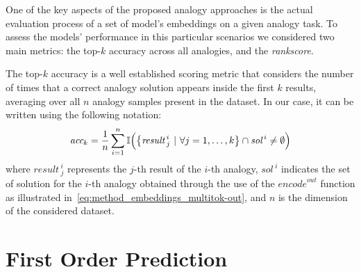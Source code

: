 One of the key aspects of the proposed analogy approaches is the actual evaluation process of a set of model's embeddings on a given analogy task.
To assess the models' performance in this particular scenarios we considered two main metrics: the top-$k$ accuracy across all analogies, and the \emph{rankscore}.

The top-$k$ accuracy is a well established scoring metric that considers the number of times that a correct analogy solution appears inside the first $k$ results, averaging over all $n$ analogy samples present in the dataset.
In our case, it can be written using the following notation:
\begin{equation}
    \label{eq:method_embeddings_topk-accuracy}
    \textit{acc}_k = \frac{1}{n} \sum_{i=1}^{n} \mathbb{I}\Bigl( {\left\{ {\textit{result}\,}^i_j \ |\ \forall j = 1,\ldots,k \right\}} \cap {\textit{sol}\,}^i \neq \emptyset \Bigr)
\end{equation}
where ${\textit{result}\,}^i_j$ represents the $j$-th result of the $i$-th analogy, ${\textit{sol}\,}^i$ indicates the set of solution for the $i$-th analogy obtained through the use of the ${\textit{encode}}^{out}$ function as illustrated in~\cref{eq:method_embeddings_multitok-out}, and $n$ is the dimension of the considered dataset.



\section{First Order Prediction}\label{sec:method_fom}

